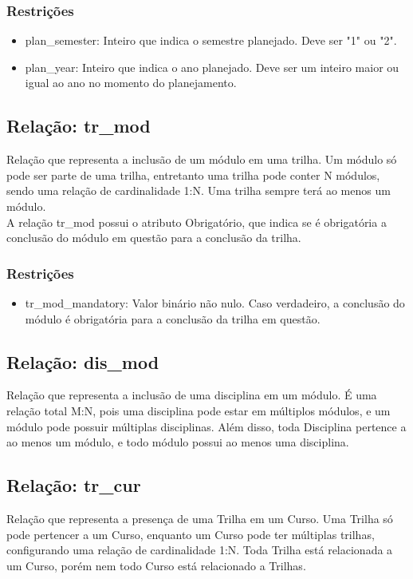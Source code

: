 \documentclass{article}
\begin{document}
  	    \subsubsection{Restrições}
  	        \begin{itemize}
  	            \item plan\_semester: Inteiro que indica o semestre planejado. Deve ser "1" ou "2".
  	            \item plan\_year: Inteiro que indica o ano planejado. Deve ser um inteiro maior ou igual ao ano no momento do planejamento.
  	        \end{itemize}
  	
  	\subsection{Relação: tr\_mod}
  	    \quad Relação que representa a inclusão de um módulo em uma trilha. Um módulo só pode ser parte de uma trilha, entretanto uma trilha pode conter N módulos, sendo uma relação de cardinalidade 1:N. Uma trilha sempre terá ao menos um módulo. \\
  	    \null \quad A relação tr\_mod possui o atributo Obrigatório, que indica se é obrigatória a conclusão do módulo em questão para a conclusão da trilha.
  	    \subsubsection{Restrições}
  	        \begin{itemize}
  	            \item tr\_mod\_mandatory: Valor binário não nulo. Caso verdadeiro, a conclusão do módulo é obrigatória para a conclusão da trilha em questão.
  		    \end{itemize}
  	   
  	\subsection{Relação: dis\_mod}
  	    \quad Relação que representa a inclusão de uma disciplina em um módulo. É uma relação total M:N, pois uma disciplina pode estar em múltiplos módulos, e um módulo pode possuir múltiplas disciplinas. Além disso, toda Disciplina pertence a ao menos um módulo, e todo módulo possui ao menos uma disciplina.
  	
  	\subsection{Relação: tr\_cur}
  	    \quad Relação que representa a presença de uma Trilha em um Curso. Uma Trilha só pode pertencer a um Curso, enquanto um Curso pode ter múltiplas trilhas, configurando uma relação de cardinalidade 1:N. Toda Trilha está relacionada a um Curso, porém nem todo Curso está relacionado a Trilhas.
\end{document}
